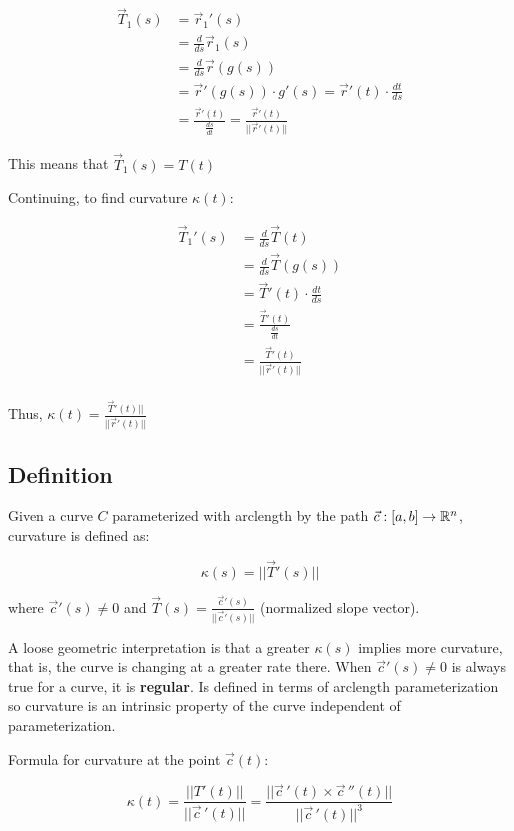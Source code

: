 \begin{align*}
    \vec{T}_1(s)&=\vec{r}_1'(s)\\
    &=\frac{d}{ds}\vec{r}_1(s)\\
    &=\frac{d}{ds}\vec{r}(g(s))\\
    &=\vec{r}'(g(s))\cdot g'(s)=\vec{r}'(t)\cdot \frac{dt}{ds}\\
    &=\frac{\vec{r}'(t)}{\frac{ds}{dt}}=\frac{\vec{r}'(t)}{||\vec{r}'(t)||}
\end{align*}

This means that $\vec{T}_1(s)=T(t)$

Continuing, to find curvature $\kappa(t)$:

\begin{align*}
    \vec{T}_1'(s)&=\frac{d}{ds}\vec{T}(t)\\
    &=\frac{d}{ds}\vec{T}(g(s))\\
    &=\vec{T}'(t)\cdot \frac{dt}{ds}\\
    &=\frac{\vec{T}'(t)}{\frac{ds}{dt}}\\
    &=\frac{\vec{T}'(t)}{||\vec{r}'(t)||}\\
\end{align*}

Thus, $\boxed{\kappa(t)=\frac{\vec{T}'(t)||}{||\vec{r}'(t)||}}$

\subsection{Definition}

Given a curve $C$ parameterized with arclength by the path $\vec{c}:[a,b]\rightarrow \mathbb{R}^n$,
curvature is defined as:

\[\boxed{\kappa(s)=||\vec{T}'(s)||}\]

where $\vec{c}'(s)\neq 0$ and $\vec{T}(s)=\frac{\vec{c}'(s)}{||\vec{c}'(s)||}$ (normalized slope vector).\newline

A loose geometric interpretation is that a greater $\kappa(s)$ implies
more curvature, that is, the curve is changing at a greater rate there.
When $\vec{c}'(s)\neq 0$ is always true for a curve, it is \textbf{regular}.
Is defined in terms of arclength parameterization so curvature
is an intrinsic property of the curve independent of parameterization.\newline

\noindent
Formula for curvature at the point $\vec{c}(t)$:

\[\boxed{\kappa(t)=\frac{||T'(t)||}{||\vec{c}\,'(t)||}=\frac{||\vec{c}\,'(t)\times \vec{c}\,''(t)||}{||\vec{c}\,'(t)||^3}}\]